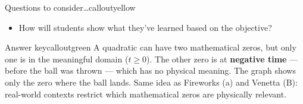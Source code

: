 \documentclass[10pt]{article}
\begin{document}
\begin{callout}{\IconPuzzle{} Questions to consider\ldots}{calloutyellow}
\begin{itemize}[leftmargin=1.4em,itemsep=1pt,topsep=1pt]
  \item How will students show what they've learned based on the objective?
\end{itemize}
\end{callout}

\begin{callout}{\IconStar{} Answer key}{calloutgreen}
A quadratic can have two mathematical zeros, but only one is in the meaningful domain ($t \ge 0$). The other zero is at \textbf{negative time} --- before the ball was thrown --- which has no physical meaning. The graph shows only the zero where the ball lands. Same idea as Fireworks (a) and Venetta (B): real-world contexts restrict which mathematical zeros are physically relevant.
\end{callout}
\end{document}
